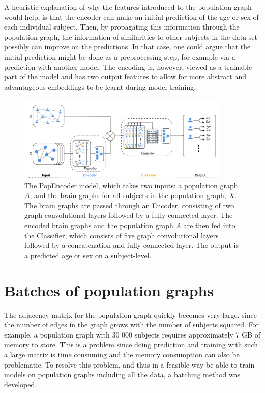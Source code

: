 A heuristic explanation of why the features introduced to the population graph would help, is that the encoder can make an initial prediction of the age or sex of each individual subject. Then, by propagating this information through the population graph, the information of similarities to other subjects in the data set possibly can improve on the predictions. In that case, one could argue that the initial prediction might be done as a preprocessing step, for example via a prediction with another model. The encoding is, however, viewed as a trainable part of the model and has two output features to allow for more abstract and advantageous embeddings to be learnt during model training. 



\begin{figure}[!htbp]
    \centering
    \includegraphics[width=0.9\textwidth]{chapters/images_methods/popencoder_v2.png}
    \caption{The PopEncoder model, which takes two inputs: a population graph $A$, and the brain graphs for all subjects in the population graph, $X$. The brain graphs are passed through an Encoder, consisting of two graph convolutional layers followed by a fully connected layer. The encoded brain graphs and the population graph $A$ are then fed into the Classifier, which consists of five graph convolutional layers followed by a concatenation and fully connected layer. The output is a predicted age or sex on a subject-level.}
    \label{fig:popencoder}
\end{figure}

\section{Batches of population graphs}
The adjacency matrix for the population graph quickly becomes very large, since the number of edges in the graph grows with the number of subjects squared. For example, a population graph with 30 000 subjects requires approximately 7 GB of memory to store. This is a problem since doing prediction and training with such a large matrix is time consuming and the memory consumption can also be problematic. To resolve this problem, and thus in a feasible way be able to train models on population graphs including all the data, a batching method was developed. 

